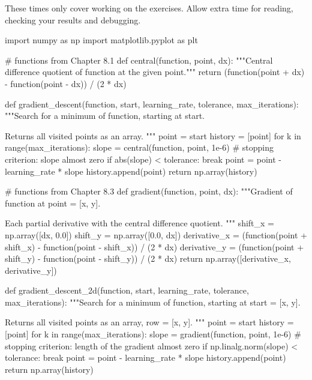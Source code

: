 \documentclass[paper=a4, fontsize=11pt, parskip=half]{scrartcl}
\begin{document}
These times only cover working on the exercises. Allow extra time for reading, checking your results and debugging.

\begin{code}
import numpy as np
import matplotlib.pyplot as plt

# functions from Chapter 8.1
def central(function, point, dx):
    """Central difference quotient of function at the given point."""
    return (function(point + dx) - function(point - dx)) / (2 * dx)

def gradient_descent(function, start, learning_rate, tolerance,
                     max_iterations):
    """Search for a minimum of function, starting at start.

    Returns all visited points as an array.
    """
    point = start
    history = [point]
    for k in range(max_iterations):
        slope = central(function, point, 1e-6)
        # stopping criterion: slope almost zero
        if abs(slope) < tolerance:
            break
        point = point - learning_rate * slope
        history.append(point)
    return np.array(history)

# functions from Chapter 8.3
def gradient(function, point, dx):
    """Gradient of function at point = [x, y].

    Each partial derivative with the central difference quotient.
    """
    shift_x = np.array([dx, 0.0])
    shift_y = np.array([0.0, dx])
    derivative_x = (function(point + shift_x)
                    - function(point - shift_x)) / (2 * dx)
    derivative_y = (function(point + shift_y)
                    - function(point - shift_y)) / (2 * dx)
    return np.array([derivative_x, derivative_y])

def gradient_descent_2d(function, start, learning_rate, tolerance,
                        max_iterations):
    """Search for a minimum of function, starting at start = [x, y].

    Returns all visited points as an array, row = [x, y].
    """
    point = start
    history = [point]
    for k in range(max_iterations):
        slope = gradient(function, point, 1e-6)
        # stopping criterion: length of the gradient almost zero
        if np.linalg.norm(slope) < tolerance:
            break
        point = point - learning_rate * slope
        history.append(point)
    return np.array(history)
\end{code}
\end{document}
